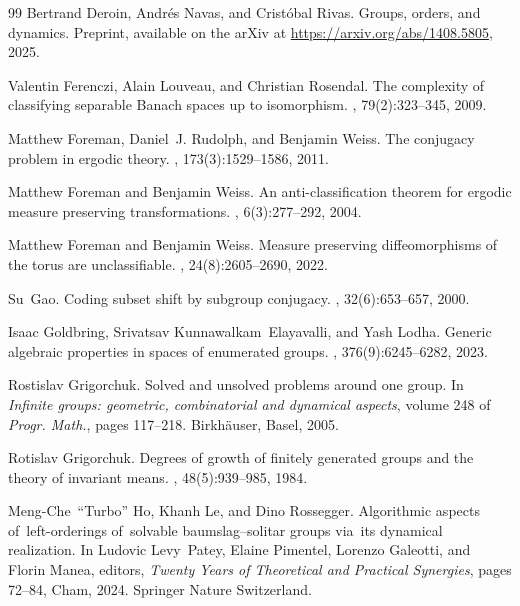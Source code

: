 \documentclass{amsart}
\theoremstyle{definition}
\theoremstyle{remark}
\begin{document}
\begin{thebibliography}{99}
Bertrand Deroin, Andr\'{e}s Navas, and Crist\'{o}bal Rivas.
\newblock Groups, orders, and dynamics.
\newblock Preprint, available on the arXiv at \url{https://arxiv.org/abs/1408.5805}, 2025.

Valentin Ferenczi, Alain Louveau, and Christian Rosendal.
\newblock The complexity of classifying separable {B}anach spaces up to isomorphism.
, 79(2):323--345, 2009.

Matthew Foreman, Daniel~J. Rudolph, and Benjamin Weiss.
\newblock The conjugacy problem in ergodic theory.
, 173(3):1529--1586, 2011.

Matthew Foreman and Benjamin Weiss.
\newblock An anti-classification theorem for ergodic measure preserving transformations.
, 6(3):277--292, 2004.

Matthew Foreman and Benjamin Weiss.
\newblock Measure preserving diffeomorphisms of the torus are unclassifiable.
, 24(8):2605--2690, 2022.

Su~Gao.
\newblock Coding subset shift by subgroup conjugacy.
, 32(6):653--657, 2000.

Isaac Goldbring, Srivatsav Kunnawalkam~Elayavalli, and Yash Lodha.
\newblock Generic algebraic properties in spaces of enumerated groups.
, 376(9):6245--6282, 2023.

Rostislav Grigorchuk.
\newblock Solved and unsolved problems around one group.
\newblock In {\em Infinite groups: geometric, combinatorial and dynamical aspects}, volume 248 of {\em Progr. Math.}, pages 117--218. Birkh\"auser, Basel, 2005.

Rotislav Grigorchuk.
\newblock Degrees of growth of finitely generated groups and the theory of invariant means.
, 48(5):939--985, 1984.

Meng-Che~``Turbo'' Ho, Khanh Le, and Dino Rossegger.
\newblock Algorithmic aspects of left-orderings of solvable baumslag--solitar groups via its dynamical realization.
\newblock In Ludovic Levy~Patey, Elaine Pimentel, Lorenzo Galeotti, and Florin Manea, editors, {\em Twenty Years of Theoretical and Practical Synergies}, pages 72--84, Cham, 2024. Springer Nature Switzerland.


\end{thebibliography}
\end{document}
